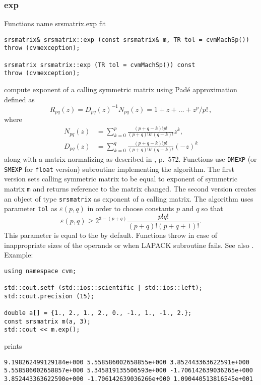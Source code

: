 \subsubsection{exp}
Functions%
\pdfdest name {srsmatrix.exp} fit
\begin{verbatim}
srsmatrix& srsmatrix::exp (const srsmatrix& m, TR tol = cvmMachSp())
throw (cvmexception);

srsmatrix srsmatrix::exp (TR tol = cvmMachSp()) const
throw (cvmexception);
\end{verbatim}
compute  exponent of a calling symmetric matrix using Pad\'e approximation
defined as
\begin{equation*}
R_{pq}(z)=D_{pq}(z)^{-1}N_{pq}(z)=1+z+\dots+z^p/p!\,,
\end{equation*}
where
\begin{align*}
N_{pq}(z)&=\sum_{k=0}^p\frac{(p+q-k)!p!}{(p+q)!k!(q-k)!}z^k,\\
D_{pq}(z)&=\sum_{k=0}^q\frac{(p+q-k)!p!}{(p+q)!k!(q-k)!}(-z)^k
\end{align*}
along with a matrix normalizing as described in
, p.~572.
Functions use \verb"DMEXP" (or \verb"SMEXP" for \verb"float" version)
\FORTRAN subroutine implementing the algorithm.
The first version sets  calling symmetric matrix to be equal to
 exponent of symmetric matrix \verb"m" and returns 
 reference to the matrix
changed. The second version
creates an object of type \verb"srsmatrix" as 
exponent of a calling matrix.
The algorithm uses parameter \verb"tol"
as $\varepsilon(p,q)$ in order to choose constants $p$ and $q$
so that
\begin{equation*}
\varepsilon(p,q)\ge 2^{3-(p+q)}\frac{p!q!}{(p+q)!(p+q+1)!}.
\end{equation*}
This parameter is equal to the
 by default.
Functions throw   
in case of
inappropriate sizes of the operands or when LAPACK subroutine fails.
See also
.
Example:
\begin{Verbatim}
using namespace cvm;

std::cout.setf (std::ios::scientific | std::ios::left); 
std::cout.precision (15);

double a[] = {1., 2., 1., 2., 0., -1., 1., -1., 2.};
const srsmatrix m(a, 3);
std::cout << m.exp();
\end{Verbatim}
prints
\begin{Verbatim}
9.198262499129184e+000 5.558586002658855e+000 3.852443363622591e+000
5.558586002658857e+000 5.345819135506593e+000 -1.706142639036265e+000
3.852443363622590e+000 -1.706142639036266e+000 1.090440513816545e+001
\end{Verbatim}
